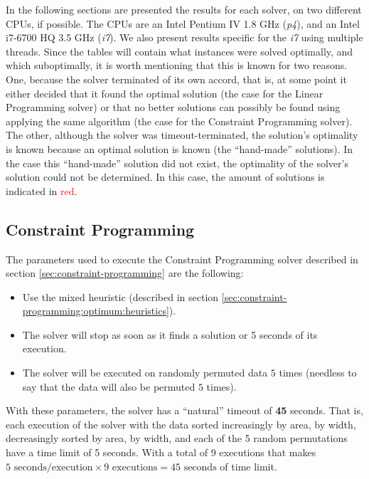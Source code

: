 In the following sections are presented the results for each solver,
on two different CPUs, if possible. The CPUs are an Intel Pentium IV 1.8 GHz
(\textit{p4}), and an Intel i7-6700 HQ 3.5 GHz (\textit{i7}). We also present
results specific for the \textit{i7} using multiple threads. Since the tables
will contain what instances were solved optimally, and which suboptimally, 
it is worth mentioning that this is known for two reasons. One, because the solver
terminated of its own accord, that is, at some point it either decided that
it found the optimal solution (the case for the Linear Programming solver) or
that no better solutions can possibly be found using applying the same algorithm
(the case for the Constraint Programming solver). The other, although the solver
was timeout-terminated, the solution's optimality is known because an optimal
solution is known (the ``hand-made'' solutions). In the case this ``hand-made''
solution did not exist, the optimality of the solver's solution could not be
determined. In this case, the amount of solutions is indicated in \textcolor{red}{red}.

\subsection{Constraint Programming}
\label{sec:benchmarking:constraint-programming}

The parameters used to execute the Constraint Programming solver described in section
\ref{sec:constraint-programming} are the following:
\begin{itemize}
	\item Use the mixed heuristic (described in section \ref{sec:constraint-programming:optimum:heuristics}).
	\item The solver will stop as soon as it finds a solution or 5 seconds of its execution.
	\item The solver will be executed on randomly permuted data $5$ times (needless to
	say that the data will also be permuted $5$ times).
\end{itemize}

With these parameters, the solver has a ``natural'' timeout of \textbf{45} seconds.
That is, each execution of the solver with the data sorted increasingly by area, by
width, decreasingly sorted by area, by width, and each of the 5 random permutations
have a time limit of 5 seconds. With a total of 9 executions that makes
$5 \text{ seconds/execution} \times 9 \text{ executions} = 45 \text{ seconds}$ of time limit.

